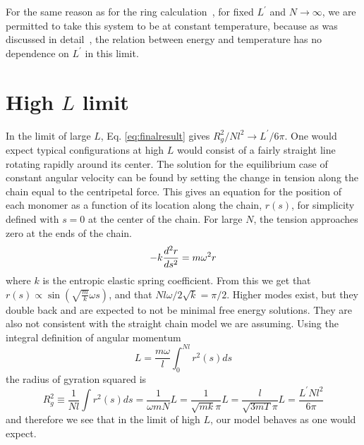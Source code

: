 \documentclass[11pt]{ucthesis}
\begin{document}
For the same reason as for the ring calculation~\cite{DeutschExactVac}, for fixed $L^\prime$ and $N\to \infty$, we are permitted to take this
system to be at constant temperature, because as was discussed in detail~\cite{DeutschExactVac}, the relation between energy and temperature
has no dependence on $L^\prime$ in this limit.


\section{High $L$ limit}
In the limit of large $L$, Eq. \ref{eq:finalresult} gives $R_g^2/Nl^2 \to L^\prime/6\pi$. One would expect typical configurations at high $L$ would consist of a fairly straight line rotating rapidly around its center. The solution for the equilibrium case of constant angular velocity can be found by setting the change in tension along the chain equal to the centripetal force. This gives an equation for the position of each monomer as a function of its location along the chain, $r(s)$, for simplicity defined with $s=0$ at the center of the chain. For large $N$, the tension approaches zero at the ends of the chain.
\begin{equation}
-k\frac{d^2r}{ds^2} = m \omega^2 r \\
\end{equation}
where $k$ is the entropic elastic spring coefficient.
From this we get that $r(s) \propto \sin(\sqrt{\frac{m}{k}}\omega s)$, and that $Nl\omega/2\sqrt{k} = \pi/2$. Higher modes exist, but they double back and are expected to not be minimal free energy solutions. They are also not consistent with the straight chain model we are assuming. Using the integral definition of angular momentum
\begin{equation}
L = \frac{m \omega}{l}\int_0^{Nl}  r^2(s)ds 
\end{equation}
the radius of gyration squared is
\begin{equation}
R_g^2 \equiv \frac{1}{Nl}\int r^2(s)ds = \frac{1}{\omega m N } L = \frac{1}{\sqrt{mk}\pi}L = \frac{l}{\sqrt{3mT}\pi}L = \frac{L^\prime Nl^2}{6\pi}
\end{equation}
and therefore we see that in the limit of high $L$, our model behaves as one would expect.
\end{document}
